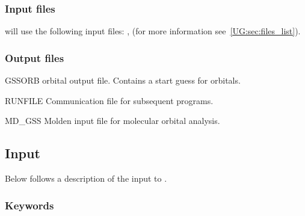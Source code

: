 \subsubsection{Input files}
 will use the following input
files: , 
(for more information see~\ref{UG:sec:files_list}).


\subsubsection{Output files}

\begin{filelist}
\item[GSSORB]
 orbital output file.
Contains a start guess for orbitals.
\item[RUNFILE]
Communication file for subsequent programs.
\item[MD\_GSS]
Molden input file for molecular orbital analysis.
\end{filelist}

\subsection{Input}
\label{UG:sec:guessorb_input}

Below follows a description of the input to .

\subsubsection{Keywords}

